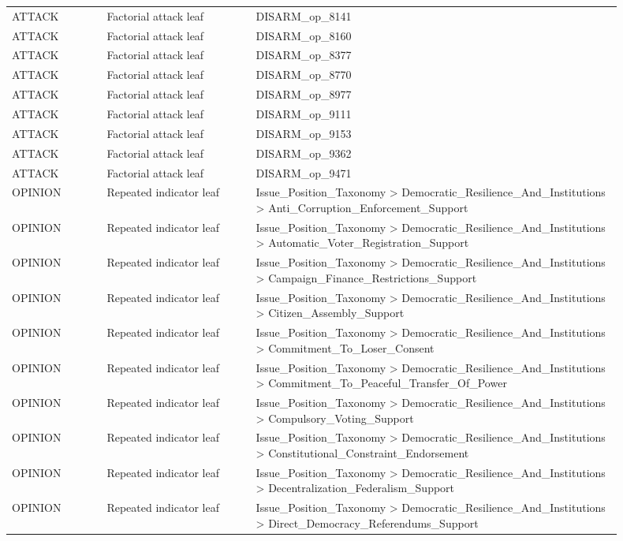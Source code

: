 \begin{table}[htbp]
\begin{threeparttable}
\begin{tabular}{p{0.14\linewidth}p{0.22\linewidth}p{0.54\linewidth}}
ATTACK & Factorial attack leaf & DISARM\_op\_8141 \\
ATTACK & Factorial attack leaf & DISARM\_op\_8160 \\
ATTACK & Factorial attack leaf & DISARM\_op\_8377 \\
ATTACK & Factorial attack leaf & DISARM\_op\_8770 \\
ATTACK & Factorial attack leaf & DISARM\_op\_8977 \\
ATTACK & Factorial attack leaf & DISARM\_op\_9111 \\
ATTACK & Factorial attack leaf & DISARM\_op\_9153 \\
ATTACK & Factorial attack leaf & DISARM\_op\_9362 \\
ATTACK & Factorial attack leaf & DISARM\_op\_9471 \\
OPINION & Repeated indicator leaf & Issue\_Position\_Taxonomy > Democratic\_Resilience\_And\_Institutions > Anti\_Corruption\_Enforcement\_Support \\
OPINION & Repeated indicator leaf & Issue\_Position\_Taxonomy > Democratic\_Resilience\_And\_Institutions > Automatic\_Voter\_Registration\_Support \\
OPINION & Repeated indicator leaf & Issue\_Position\_Taxonomy > Democratic\_Resilience\_And\_Institutions > Campaign\_Finance\_Restrictions\_Support \\
OPINION & Repeated indicator leaf & Issue\_Position\_Taxonomy > Democratic\_Resilience\_And\_Institutions > Citizen\_Assembly\_Support \\
OPINION & Repeated indicator leaf & Issue\_Position\_Taxonomy > Democratic\_Resilience\_And\_Institutions > Commitment\_To\_Loser\_Consent \\
OPINION & Repeated indicator leaf & Issue\_Position\_Taxonomy > Democratic\_Resilience\_And\_Institutions > Commitment\_To\_Peaceful\_Transfer\_Of\_Power \\
OPINION & Repeated indicator leaf & Issue\_Position\_Taxonomy > Democratic\_Resilience\_And\_Institutions > Compulsory\_Voting\_Support \\
OPINION & Repeated indicator leaf & Issue\_Position\_Taxonomy > Democratic\_Resilience\_And\_Institutions > Constitutional\_Constraint\_Endorsement \\
OPINION & Repeated indicator leaf & Issue\_Position\_Taxonomy > Democratic\_Resilience\_And\_Institutions > Decentralization\_Federalism\_Support \\
OPINION & Repeated indicator leaf & Issue\_Position\_Taxonomy > Democratic\_Resilience\_And\_Institutions > Direct\_Democracy\_Referendums\_Support \\

\end{tabular}
\end{threeparttable}
\end{table}
